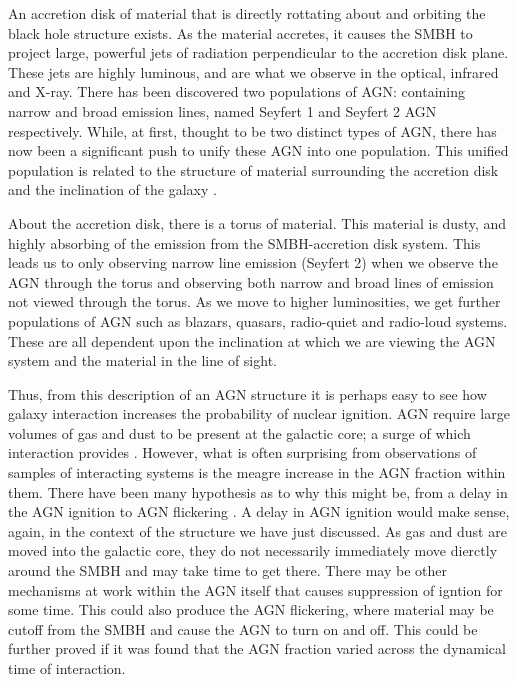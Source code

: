 An accretion disk of material that is directly rottating about and orbiting the black hole structure exists. As the material accretes, it causes the SMBH to project large, powerful jets of radiation perpendicular to the accretion disk plane. These jets are highly luminous, and are what we observe in the optical, infrared and X-ray. There has been discovered two populations of AGN: containing narrow and broad emission lines, named Seyfert 1 and Seyfert 2 AGN respectively. While, at first, thought to be two distinct types of AGN, there has now been a significant push to unify these AGN into one population. This unified population is related to the structure of material surrounding the accretion disk and the inclination of the galaxy \citep[for a review of the unification, see][]{2015ARA&A..53..365N}.

About the accretion disk, there is a torus of material. This material is dusty, and highly absorbing of the emission from the SMBH-accretion disk system. This leads us to only observing narrow line emission (Seyfert 2) when we observe the AGN through the torus and observing both narrow and broad lines of emission not viewed through the torus. As we move to higher luminosities, we get further populations of AGN such as blazars, quasars, radio-quiet and radio-loud systems. These are all dependent upon the inclination at which we are viewing the AGN system and the material in the line of sight.

Thus, from this description of an AGN structure it is perhaps easy to see how galaxy interaction increases the probability of nuclear ignition. AGN require large volumes of gas and dust to be present at the galactic core; a surge of which interaction provides \citep[][provides an excellent summary of this process from the point of view of simulations]{2008ApJS..175..356H}. However, what is often surprising from observations of samples of interacting systems is the meagre increase in the AGN fraction within them. There have been many hypothesis as to why this might be, from a delay in the AGN ignition \citep{2011MNRAS.418.2043E} to AGN flickering \citep{2015MNRAS.451.2517S}. A delay in AGN ignition would make sense, again, in the context of the structure we have just discussed. As gas and dust are moved into the galactic core, they do not necessarily immediately move dierctly around the SMBH and may take time to get there. There may be other mechanisms at work within the AGN itself that causes suppression of igntion for some time. This could also produce the AGN flickering, where material may be cutoff from the SMBH and cause the AGN to turn on and off. This could be further proved if it was found that the AGN fraction varied across the dynamical time of interaction.

